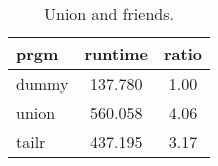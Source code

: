 \begin{table}[h]
  \begin{center}
    \caption{Union and friends.}
    \label{tab:table1}
    \begin{tabular}{l|c|c} 
      \textbf{prgm} & \textbf{runtime} & \textbf{ratio}\\
      \hline
  dummy      &  137.780 &     1.00\\
  union      &  560.058 &     4.06\\
  tailr      &  437.195 &     3.17\\
\end{tabular} \end{center} \end{table}